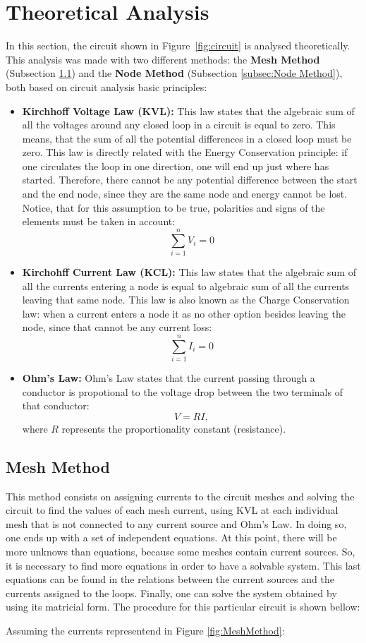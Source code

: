 \section{Theoretical Analysis}
\label{sec:analysis}

In this section, the circuit shown in Figure~\ref{fig:circuit} is analysed
theoretically. This analysis was made with two different methods: the \textbf{Mesh Method} (Subsection \ref{subsec:Mesh Method}) and the \textbf{Node Method} (Subsection \ref{subsec:Node Method}), both based on circuit analysis basic principles:
\begin{itemize}
\item \textbf{Kirchhoff Voltage Law (KVL):} This law states that the algebraic sum of all the voltages around any closed loop in a circuit is equal to zero. This means, that the sum of all the potential differences in a closed loop must be zero. This law is directly related with the Energy Conservation principle: if one circulates the loop in one direction, one will end up just where has started. Therefore, there cannot be any potential difference between the start and the end node, since they are the same node and energy cannot be lost. Notice, that for this assumption to be true, polarities and signs of the elements must be taken in account:$$\sum_{i=1}^{n}V_{i}=0$$
\item \textbf{Kirchohff Current Law (KCL):} This law states that the algebraic sum of all the currents entering a node is equal to algebraic sum of all the currents leaving that same node. This law is also known as the Charge Conservation law: when a current enters a node it as no other option besides leaving the node, since that cannot be any current loss: $$\sum_{i=1}^{n}I_{i}=0$$
  \item \textbf{Ohm's Law:} Ohm's Law states that the current passing through a conductor is propotional to the voltage drop between the two terminals of that conductor: $$V = RI,$$ where $R$ represents the proportionality constant (resistance). 
  
\end{itemize}


\subsection{Mesh Method}
\label{subsec:Mesh Method}\par
This method consists on assigning currents to the circuit meshes and solving the circuit to find the values of each mesh current, using KVL at each individual mesh that is not connected to any current source and Ohm's Law. In doing so, one ends up with a set of independent equations. At this point, there will be more unknows than equations, because some meshes contain current sources. So, it is necessary to find more equations in order to have a solvable system. This last equations can be found in the relations between the current sources and the currents assigned to the loops. Finally, one can solve the system obtained by using its matricial form. The procedure for this particular circuit is shown bellow:\par
Assuming the currents representend in Figure \ref{fig:MeshMethod}:

